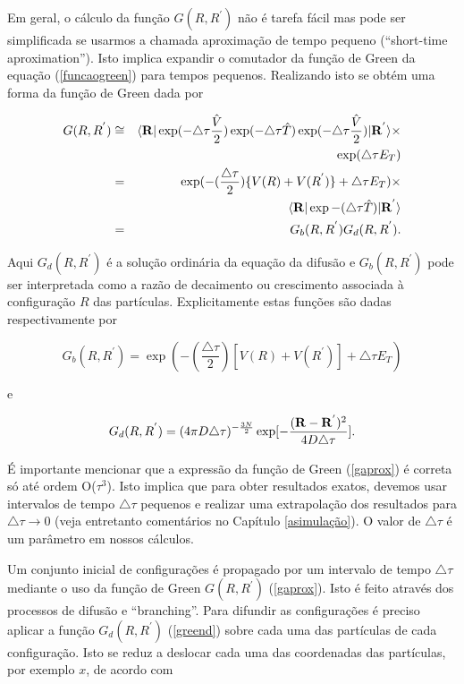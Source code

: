 \documentclass[12pt,twoside,a4paper]{report}
\begin{document}
Em geral, o cálculo da função $G(R,R^{'})$ não é tarefa fácil mas
pode ser
simplificada se usarmos a chamada aproximação de tempo pequeno
(``short-time
aproximation''). Isto implica expandir o comutador da função de
Green da equação
(\ref{funcaogreen}) para tempos pequenos. Realizando isto se obtém
uma forma da função de Green dada por

\begin{eqnarray} \label{gaprox}
G(R,R^{'}) &\cong& \langle {\bf R}|\exp(-\triangle \tau
\frac{\hat{V}}{2})
\exp(-\triangle \tau \hat{T}) \exp(-\triangle \tau
\frac{\hat{V}}{2})|{\bf
R}^{'}\rangle \nonumber \times \\ &&
\exp(\triangle \tau E_T) \nonumber \\ &=&
\exp(-(\frac{\triangle\tau}{2})\{V(R) +
V(R^{'})\} + \triangle\tau E_T) \nonumber \times \\ && \langle
{\bf R}|
\exp-(\triangle\tau \hat{T})|{\bf R}^{'} \rangle \nonumber \\ &=&
G_b(R,R^{'})
G_d(R,R^{'}).
\end{eqnarray}

\noindent Aqui $G_d(R,R^{'})$ é a solução ordinária da equação da
difusão e
$G_b(R,R^{'})$ pode ser interpretada como a razão de decaimento ou 
crescimento associada à configuração $R$ das partículas.
Explicitamente estas funções são
dadas respectivamente por

\begin{equation} \label{greenb}
G_b(R,R^{'}) = \exp(- (\frac{\triangle\tau}{2}) [V(R) + V(R^{'})]
+ \triangle\tau
E_T)
\end{equation}

\noindent
e

\begin{equation} \label{greend}
G_d(R,R^{'}) = (4 \pi D \triangle\tau)^{-\frac{3N}{2}}
\exp[-\frac{({\bf R} - {\bf
R}^{'})^2}{4D\triangle\tau}].
\end{equation}

É importante mencionar que a expressão da função de Green (\ref{gaprox}) é correta só
até ordem
O($\tau^3$). Isto implica que para obter resultados 
exatos, devemos usar
intervalos de tempo $\triangle\tau$ pequenos e
realizar uma extrapolação dos resultados para $\triangle \tau \rightarrow
0$ (veja entretanto comentários no Capítulo \ref{asimulação}). O valor de 
$\triangle \tau$ é um
parâmetro
em nossos cálculos.

Um conjunto inicial de configurações é propagado por um
intervalo de tempo
$\triangle\tau$ mediante o uso da
função de Green $G(R,R^{'})$
(\ref{gaprox}). Isto é feito através dos processos
de difusão e
``branching''. Para difundir as configurações é preciso aplicar a
função $G_d(R,R^{'})$ (\ref{greend})
sobre cada uma das partículas de cada configuração. Isto se reduz a
deslocar cada uma das
coordenadas das partículas, por exemplo $x$, de acordo com
\end{document}
